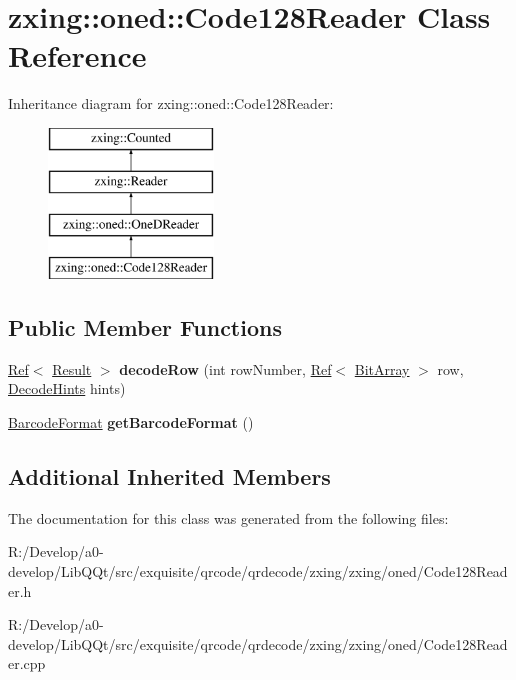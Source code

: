 \hypertarget{classzxing_1_1oned_1_1_code128_reader}{}\section{zxing\+:\+:oned\+:\+:Code128\+Reader Class Reference}
\label{classzxing_1_1oned_1_1_code128_reader}
Inheritance diagram for zxing\+:\+:oned\+:\+:Code128\+Reader\+:\begin{figure}[H]
\begin{center}
\leavevmode
\includegraphics[height=4.000000cm]{classzxing_1_1oned_1_1_code128_reader}
\end{center}
\end{figure}
\subsection*{Public Member Functions}
\begin{DoxyCompactItemize}
\item 
\mbox{\label{classzxing_1_1oned_1_1_code128_reader_a16e88fc3a01e37ea4f0cdef86699d212}} 
\mbox{\hyperlink{classzxing_1_1_ref}{Ref}}$<$ \mbox{\hyperlink{classzxing_1_1_result}{Result}} $>$ {\bfseries decode\+Row} (int row\+Number, \mbox{\hyperlink{classzxing_1_1_ref}{Ref}}$<$ \mbox{\hyperlink{classzxing_1_1_bit_array}{Bit\+Array}} $>$ row, \mbox{\hyperlink{classzxing_1_1_decode_hints}{Decode\+Hints}} hints)
\item 
\mbox{\label{classzxing_1_1oned_1_1_code128_reader_a1b27e2db1e2d7babe1a191292b1225b2}} 
\mbox{\hyperlink{classzxing_1_1_barcode_format}{Barcode\+Format}} {\bfseries get\+Barcode\+Format} ()
\end{DoxyCompactItemize}
\subsection*{Additional Inherited Members}


The documentation for this class was generated from the following files\+:\begin{DoxyCompactItemize}
\item 
R\+:/\+Develop/a0-\/develop/\+Lib\+Q\+Qt/src/exquisite/qrcode/qrdecode/zxing/zxing/oned/Code128\+Reader.\+h\item 
R\+:/\+Develop/a0-\/develop/\+Lib\+Q\+Qt/src/exquisite/qrcode/qrdecode/zxing/zxing/oned/Code128\+Reader.\+cpp\end{DoxyCompactItemize}
